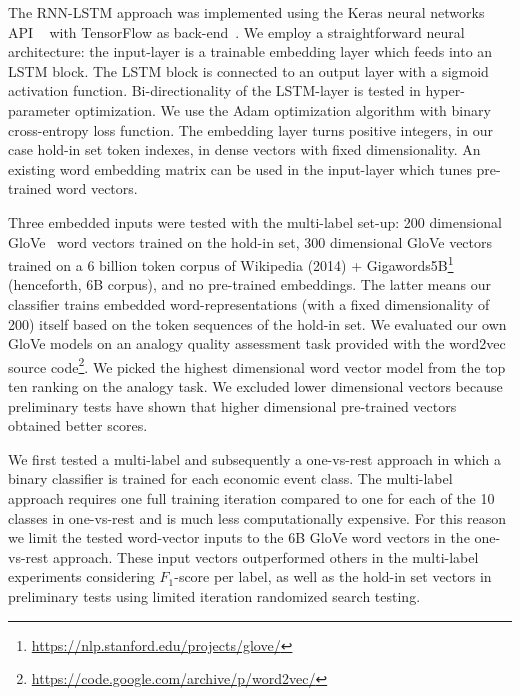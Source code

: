 \documentclass[11pt,a4paper]{article}
\begin{document}
The RNN-LSTM approach was implemented using the Keras neural networks API ~\cite{chollet2015keras} with TensorFlow as back-end~\cite{tensorflow2015whitepaper}.
We employ a straightforward neural architecture: the input-layer is a trainable embedding layer which feeds into an LSTM block.
The LSTM block is connected to an output layer with a sigmoid activation function.
Bi-directionality of the LSTM-layer is tested in hyper-parameter optimization.
We use the Adam optimization algorithm with binary cross-entropy loss function.
The embedding layer turns positive integers, in our case hold-in set token indexes, in dense vectors with fixed dimensionality.
An existing word embedding matrix can be used in the input-layer which tunes pre-trained word vectors.

Three embedded inputs were tested with the multi-label set-up: 200 dimensional GloVe~\cite{pennington2014glove} word vectors trained on the hold-in set, 300 dimensional GloVe vectors trained on a 6 billion token corpus of Wikipedia (2014) + Gigawords5B\footnote{\url{https://nlp.stanford.edu/projects/glove/}} (henceforth, 6B corpus), and no pre-trained embeddings.
The latter means our classifier trains embedded word-representations (with a fixed dimensionality of 200) itself based on the token sequences of the hold-in set.
We evaluated our own GloVe models on an analogy quality assessment task provided with the word2vec source code\footnote{\url{https://code.google.com/archive/p/word2vec/}}.
We picked the highest dimensional word vector model from the top ten ranking on the analogy task.
We excluded lower dimensional vectors because preliminary tests have shown that higher dimensional pre-trained vectors obtained better scores.

We first tested a multi-label and subsequently a one-vs-rest approach in which a binary classifier is trained for each economic event class.
The multi-label approach requires one full training iteration compared to one for each of the 10 classes in one-vs-rest and is much less computationally expensive.
For this reason we limit the tested word-vector inputs to the 6B GloVe word vectors in the one-vs-rest approach.
These input vectors outperformed others in the multi-label experiments considering $F_1$-score per label, as well as the hold-in set vectors in preliminary tests using limited iteration randomized search testing.
\end{document}
